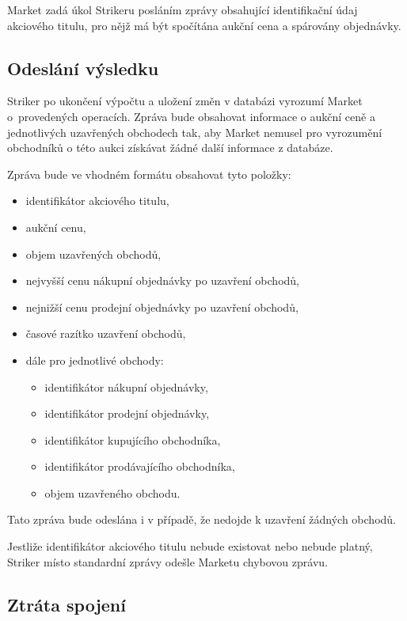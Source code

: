 \documentclass[thesis=M,czech]{FITthesis}[2012/06/26]
\begin{document}
Market zadá úkol Strikeru posláním zprávy obsahující identifikační údaj akciového titulu, pro nějž má být spočítána aukční 
cena a spárovány objednávky.


\subsection{Odeslání výsledku}
\label{sec:strikerresult}

Striker po ukončení výpočtu a uložení změn v databázi vyrozumí Market o~provedených operacích. Zpráva bude
obsahovat informace o aukční ceně a jednotlivých uzavřených obchodech tak, aby Market nemusel pro vyrozumění
obchodníků o této aukci získávat žádné další informace z databáze.

Zpráva bude ve vhodném formátu obsahovat tyto položky:

\begin{itemize}
	\item identifikátor akciového titulu,
	\item aukční cenu,
	\item objem uzavřených obchodů, 
	\item nejvyšší cenu nákupní objednávky po uzavření obchodů, 
	\item nejnižší cenu prodejní objednávky po uzavření obchodů, 
	\item časové razítko uzavření obchodů,
	\item dále pro jednotlivé obchody:
		\begin{itemize}
			\item identifikátor nákupní objednávky,
			\item identifikátor prodejní objednávky,
			\item identifikátor kupujícího obchodníka,
			\item identifikátor prodávajícího obchodníka,
			\item objem uzavřeného obchodu.
		\end{itemize}
\end{itemize}

Tato zpráva bude odeslána i v případě, že nedojde k uzavření žádných obchodů. 

Jestliže identifikátor akciového titulu nebude existovat nebo nebude platný, Striker místo standardní zprávy odešle Marketu 
chybovou zprávu.


\subsection{Ztráta spojení}
\end{document}
